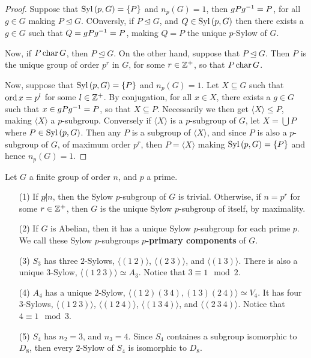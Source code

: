\begin{proof}
    Suppose that $\operatorname{Syl}{(p,G)}=\{P\}$ and $n_p(G)=1$, then $gPg^{-1}=P$, for
    all $g \in G$ making $P \unlhd G$. COnversly, if $P \unlhd G$, and  $Q \in
    \operatorname{Syl}{(p,G)}$ then there exists a $g \in G$ such that  $Q=gPg^{-1}=P$, making
    $Q=P$ the unique $p$-Sylow of $G$.

    Now, if  $P \operatorname{char} G$, then  $P \unlhd G$. On the other hand, suppose that
    $P \unlhd G$. Then  $P$ is the unique group of order $p^r$ in $G$, for some
     $r \in \mathbb{Z}^+$, so that  $P \operatorname{char} G$.

     Now, suppose that $\operatorname{Syl}{(p,G)}=\{P\}$ and $n_p(G)=1$. Let $X \subseteq G$
     such that $\operatorname{ord}{x}=p^l$ for some $l \in \mathbb{Z}^+$. By conjugation, for all  $x
     \in X$, there exists a  $g \in G$ such that  $x \in gPg^{-1}=P$, so that
     $X \subseteq P$. Necessarily we then get  $\langle X \rangle \leq P$,
     making $\langle X \rangle$ a $p$-subgroup. Conversely if  $\langle X
     \rangle$ is a $p$-subgroup of $G$, let $X=\bigcup{P}$ where $P \in
     \operatorname{Syl}{(p,G)}$. Then any $P$ is a subgroup of  $\langle X \rangle$, and since
     $P$ is also a $p$-subgroup of  $G$, of maximum order $p^r$, then
     $P=\langle X \rangle$ making $\operatorname{Syl}{(p,G)}=\{P\}$ and hence $n_p(G)=1$.
\end{proof}

\begin{example}\label{4.12}
    Let $G$ a finite group of order $n$, and  $p$ a prime.
    \begin{enumerate}
        \item[(1)] If $p \not| n$, then the Sylow $p$-subgroup of $G$ is
            trivial. Otherwise, if  $n=p^r$ for some  $r \in \mathbb{Z}^+$, then $G$ is
            the unique Sylow $p$-subgroup of itself, by maximality.

        \item[(2)] If $G$ is Abelian, then it has a unique Sylow $p$-subgroup
            for each prime $p$. We call these Sylow $p$-subgroups
            \textbf{$p$-primary components} of $G$.

        \item[(3)] $S_3$ has three $2$-Sylows, $\langle (1 \ 2) \rangle$,
            $\langle (2 \ 3) \rangle$, and  $\langle (1 \ 3) \rangle$. There is
            also a unique $3$-Sylow,  $\langle (1 \ 2 \ 3) \rangle \simeq A_3$.
            Notice that $3 \equiv 1 \mod{2}$.

        \item[(4)] $A_4$ has a unique $2$-Sylow,  $\langle (1 \ 2)(3 \ 4),
            (1 \ 3)(2 \ 4) \rangle \simeq V_4$. It has four $3$-Sylows,
            $\langle (1 \ 2 \ 3) \rangle$, $\langle (1 \ 2 \ 4) \rangle$, $\langle
            (1 \ 3 \ 4) \rangle$, and $\langle (2 \ 3 \ 4) \rangle$. Notice that
             $4 \equiv 1 \mod{3}$.

         \item[(5)] $S_4$ has $n_2=3$, and  $n_3=4$. Since $S_4$ containes a
             subgroup isomorphic to $D_8$, then every $2$-Sylow of $S_4$ is
             isomorphic to $D_8$.
    \end{enumerate}
\end{example}
